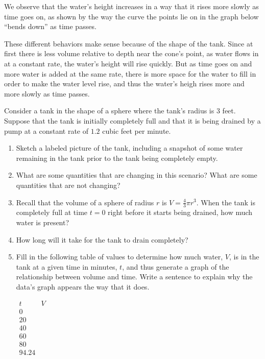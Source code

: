 \documentclass{ximera}
\begin{document}
We observe that the water's height increases in a way that it rises more slowly as time goes on, as shown by the way the curve the points lie on in the graph below ``bends down'' as time passes. 

These different behaviors make sense because of the shape of the tank.  Since at first there is less volume relative to depth near the cone's point, as water flows in at a constant rate, the water's height will rise quickly.  But as time goes on and more water is added at the same rate, there is more space for the water to fill in order to make the water level rise, and thus the water's heigh rises more and more slowly as time passes.%


\begin{exploration}

Consider a tank in the shape of a sphere where the tank's radius is $3$ feet.  Suppose that the tank is initially completely full and that it is being drained by a pump at a constant rate of $1.2$ cubic feet per minute.%

\begin{enumerate}[label=\alph*.]
\item Sketch a labeled picture of the tank, including a snapshot of some water remaining in the tank prior to the tank being completely empty.%
\item What are some quantities that are changing in this scenario?  What are some quantities that are not changing?%
\item Recall that the volume of a sphere of radius $r$ is $V = \frac{4}{3} \pi r^3$.  When the tank is completely full at time $t = 0$ right before it starts being drained, how much water is present?%
\item How long will it take for the tank to drain completely?%
\item Fill in the following table of values to determine how much water, $V$, is in the tank at a given time in minutes, $t$, and thus generate a graph of the relationship between volume and time.  Write a sentence to explain why the data's graph appears the way that it does.%

\begin{center}
$
\begin{array}{cc}
t&V\\
\hline
0&\\
20&\\
40&\\
60&\\
80&\\
94.24&
\end{array}
$
\end{center}


\end{enumerate}
\end{exploration}
\end{document}
